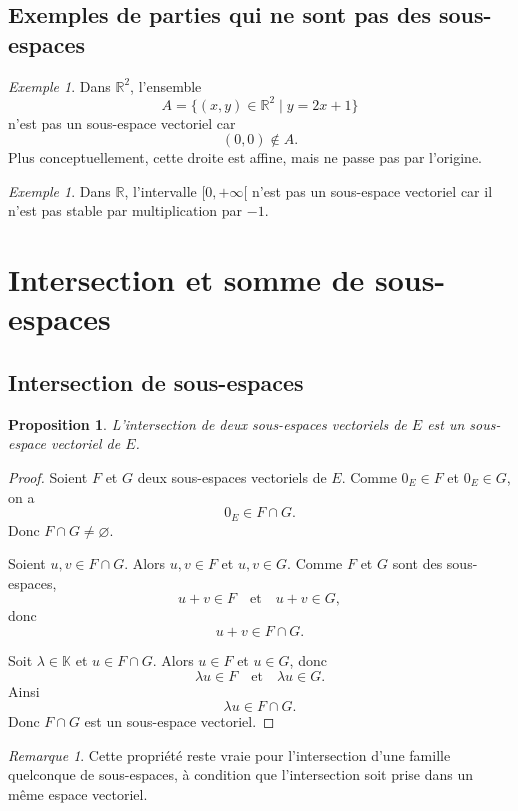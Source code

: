 \documentclass[11pt,a4paper]{article}
\newtheorem{proposition}[definition]{Proposition}
\theoremstyle{remark}
\newtheorem{remarque}[definition]{Remarque}
\newtheorem{exemple}[definition]{Exemple}
\newcommand{\R}{\mathbb{R}}
\newcommand{\K}{\mathbb{K}}
\begin{document}
\subsection{Exemples de parties qui ne sont pas des sous-espaces}

\begin{exemple}
Dans \(\R^2\), l’ensemble
\[
A=\{(x,y)\in\R^2\mid y=2x+1\}
\]
n’est pas un sous-espace vectoriel car
\[
(0,0)\notin A.
\]
Plus conceptuellement, cette droite est affine, mais ne passe pas par l’origine.
\end{exemple}

\begin{exemple}
Dans \(\R\), l’intervalle \([0,+\infty[\) n’est pas un sous-espace vectoriel car il n’est pas stable par multiplication par \(-1\).
\end{exemple}

\section{Intersection et somme de sous-espaces}

\subsection{Intersection de sous-espaces}

\begin{proposition}
L’intersection de deux sous-espaces vectoriels de \(E\) est un sous-espace vectoriel de \(E\).
\end{proposition}

\begin{proof}
Soient \(F\) et \(G\) deux sous-espaces vectoriels de \(E\).  
Comme \(0_E\in F\) et \(0_E\in G\), on a
\[
0_E\in F\cap G.
\]
Donc \(F\cap G\neq \varnothing\).

Soient \(u,v\in F\cap G\). Alors \(u,v\in F\) et \(u,v\in G\). Comme \(F\) et \(G\) sont des sous-espaces,
\[
u+v\in F \quad \text{et} \quad u+v\in G,
\]
donc
\[
u+v\in F\cap G.
\]

Soit \(\lambda\in\K\) et \(u\in F\cap G\). Alors \(u\in F\) et \(u\in G\), donc
\[
\lambda u\in F \quad \text{et} \quad \lambda u\in G.
\]
Ainsi
\[
\lambda u\in F\cap G.
\]
Donc \(F\cap G\) est un sous-espace vectoriel.
\end{proof}

\begin{remarque}
Cette propriété reste vraie pour l’intersection d’une famille quelconque de sous-espaces, à condition que l’intersection soit prise dans un même espace vectoriel.
\end{remarque}
\end{document}
